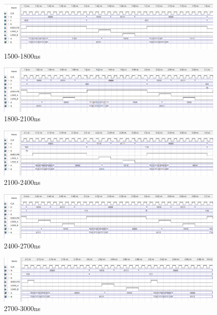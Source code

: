 \documentclass[12pt]{article}
\begin{document}
\begin{figure}[H]
    \centering
    \includegraphics[width=18cm]{1500-1800.png}
    \caption{1500-1800ns}
\end{figure}
\begin{figure}[H]
    \centering
    \includegraphics[width=18cm]{1800-2100.png}
    \caption{1800-2100ns}
\end{figure}
\begin{figure}[H]
    \centering
    \includegraphics[width=18cm]{2100-2400.png}
    \caption{2100-2400ns}
\end{figure}
\begin{figure}[H]
    \centering
    \includegraphics[width=18cm]{2400-2700.png}
    \caption{2400-2700ns}
\end{figure}
\begin{figure}[H]
    \centering
    \includegraphics[width=18cm]{2700-3000.png}
    \caption{2700-3000ns}
\end{figure}

\newpage


\end{document}
